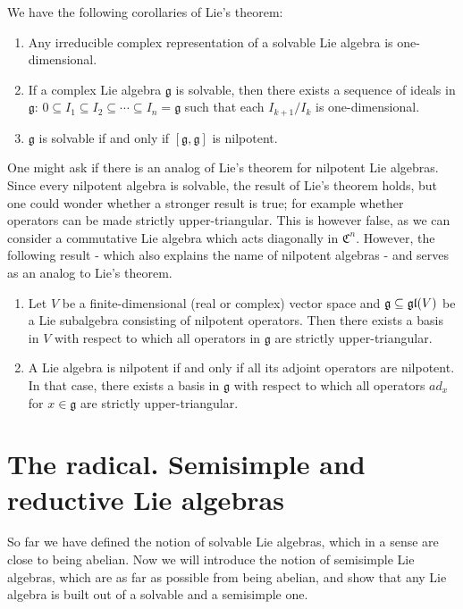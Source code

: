 \documentclass{report}
\begin{document}
We have the following corollaries of Lie's theorem:
\begin{corollary}
    \begin{enumerate}[label = (\roman*)]
        \item Any irreducible complex representation of a solvable Lie algebra is one-dimensional.
        \item If a complex Lie algebra $\mathfrak g$ is solvable, then there exists a sequence of ideals in $\mathfrak g$: $0 \subseteq I_1 \subseteq I_2 \subseteq \cdots \subseteq I_n = \mathfrak g$ such that each $I_{k+1}/I_k$ is one-dimensional.
        \item $\mathfrak g$ is solvable if and only if $[\mathfrak g, \mathfrak g]$ is nilpotent.
    \end{enumerate}
\end{corollary}

One might ask if there is an analog of Lie's theorem for nilpotent Lie algebras.
Since every nilpotent algebra is solvable, the result of Lie's theorem holds, but one could wonder whether a stronger result is true; for example whether operators can be made strictly upper-triangular.
This is however false, as we can consider a commutative Lie algebra which acts diagonally in $\mathfrak C^n$.
However, the following result - which also explains the name of nilpotent algebras - and serves as an analog to Lie's theorem. 
\begin{theorem}\label{thm:engel}
    \begin{enumerate}[label = (\roman*)]
        \item Let $V$ be a finite-dimensional (real or complex) vector space and $\mathfrak g \subseteq \operatorname{{\mathfrak{gl}}}(V)$ be a Lie subalgebra consisting of nilpotent operators.
        Then there exists a basis in $V$ with respect to which all operators in $\mathfrak g$ are strictly upper-triangular.
        \item A Lie algebra is nilpotent if and only if all its adjoint operators are nilpotent.
        In that case, there exists a basis in $\mathfrak g$ with respect to which all operators $ad_x$ for $x \in \mathfrak g$ are strictly upper-triangular.
    \end{enumerate}
\end{theorem}

\section{The radical. Semisimple and reductive Lie algebras}
So far we have defined the notion of solvable Lie algebras, which in a sense are close to being abelian.
Now we will introduce the notion of semisimple Lie algebras, which are as far as possible from being abelian, and show that any Lie algebra is built out of a solvable and a semisimple one.
\end{document}
